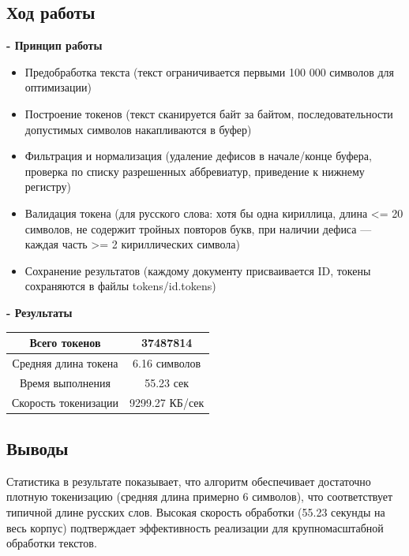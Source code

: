 \documentclass[pdf, unicode, 12pt, a4paper, oneside, fleqn]{article}
\begin{document}
\subsection*{Ход работы}

\textbf{- Принцип работы} 
\begin{itemize}
\item Предобработка текста (текст ограничивается первыми 100 000 символов для оптимизации) 
\item Построение токенов (текст сканируется байт за байтом, 
последовательности допустимых символов накапливаются в буфер) 
\item Фильтрация и нормализация (удаление дефисов в начале/конце буфера, проверка по списку разрешенных аббревиатур, приведение к нижнему регистру)
\item Валидация токена (для русского слова: хотя бы одна кириллица, длина <= 20 символов, не содержит тройных повторов букв, при наличии 
дефиса — каждая часть >= 2 кириллических символа) 
\item Сохранение результатов (каждому документу присваивается ID, токены сохраняются в файлы tokens/{id}.tokens) 
\end{itemize}

\textbf{- Результаты} 

\begin{center}
\begin{tabular}{ |c|c| }
\hline
 Всего токенов & 37487814 \\  
 \hline
 Средняя длина токена & 6.16 символов \\ 
 \hline
 Время выполнения & 55.23 сек \\
 \hline
 Скорость токенизации & 9299.27 КБ/сек \\
 \hline
\end{tabular}
\end{center} 

\subsection*{Выводы}
Статистика в результате показывает, что алгоритм обеспечивает 
достаточно плотную токенизацию (средняя длина примерно 6 символов), что соответствует типичной длине русских слов. Высокая скорость обработки (55.23 секунды на весь корпус) подтверждает эффективность реализации для крупномасштабной обработки текстов.
\end{document}

